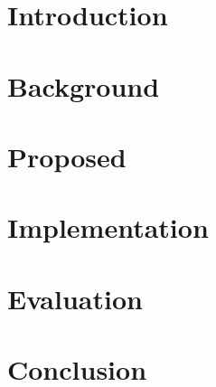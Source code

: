 
\chapter{Introduction}\label{chapter:introduction}
\graphicspath{{Manuscript/}}




\chapter{Background}\label{chapter:related}
\graphicspath{{Manuscript/}}


\chapter{Proposed}\label{chapter:proposed}
\graphicspath{{Manuscript/}}




\chapter{Implementation}\label{chapter:implemetation}
\graphicspath{{Manuscript/}}




\chapter{Evaluation}\label{chapter:evaluation}
\graphicspath{{Manuscript/}}



\chapter{Conclusion}\label{chapter:conclusion}
\graphicspath{{Manuscript/}}


